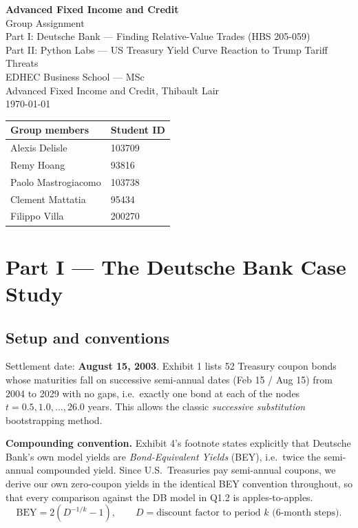 \documentclass[11pt]{article}
\begin{document}
\begin{titlepage}
\centering
\vspace*{2cm}
{\LARGE\bfseries\color{edhecred} Advanced Fixed Income and Credit}\\[0.4cm]
{\Large Group Assignment}\\[1.2cm]
{\large Part I: Deutsche Bank --- Finding Relative-Value Trades (HBS 205-059)}\\
{\large Part II: Python Labs --- US Treasury Yield Curve Reaction to Trump Tariff Threats}\\[2cm]
{\large EDHEC Business School --- MSc\\ Advanced Fixed Income and Credit, Thibault Lair}\\[2cm]
{\large \today}\\[1cm]
\vfill
{\small
\begin{tabular}{ll}
\toprule
\textbf{Group members} & \textbf{Student ID} \\
\midrule
Alexis Delisle      & 103709 \\
Remy Hoang          & 93816 \\
Paolo Mastrogiacomo & 103738 \\
Clement Mattatia    & 95434 \\
Filippo Villa       & 200270 \\
\bottomrule
\end{tabular}}
\end{titlepage}

\tableofcontents
\newpage

\section{Part I --- The Deutsche Bank Case Study}

\subsection*{Setup and conventions}
Settlement date: \textbf{August 15, 2003}. Exhibit 1 lists 52 Treasury coupon
bonds whose maturities fall on successive semi-annual dates (Feb 15 / Aug 15)
from 2004 to 2029 with no gaps, i.e.\ exactly one bond at each of the nodes
$t=0.5,1.0,\dots,26.0$ years. This allows the classic \emph{successive
substitution} bootstrapping method.

\textbf{Compounding convention.} Exhibit 4's footnote states explicitly that
Deutsche Bank's own model yields are \emph{Bond-Equivalent Yields} (BEY),
i.e.\ twice the semi-annual compounded yield. Since U.S.\ Treasuries pay
semi-annual coupons, we derive our own zero-coupon yields in the identical
BEY convention throughout, so that every comparison against the DB model in
Q1.2 is apples-to-apples.
\[\text{BEY} = 2\left(D^{-1/k}-1\right), \qquad D = \text{discount factor to period } k \text{ (6-month steps)}.\]
\end{document}
